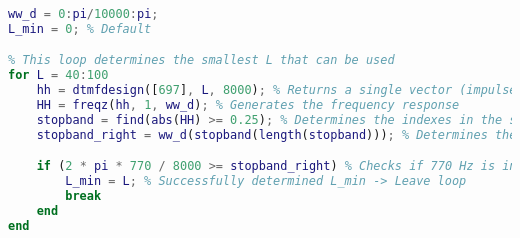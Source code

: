 \begin{lstlisting}[language=Matlab]
ww_d = 0:pi/10000:pi;
L_min = 0; % Default

% This loop determines the smallest L that can be used
for L = 40:100
    hh = dtmfdesign([697], L, 8000); % Returns a single vector (impulse response)
    HH = freqz(hh, 1, ww_d); % Generates the frequency response
    stopband = find(abs(HH) >= 0.25); % Determines the indexes in the stopband
    stopband_right = ww_d(stopband(length(stopband))); % Determines the right index

    if (2 * pi * 770 / 8000 >= stopband_right) % Checks if 770 Hz is in the stopband
        L_min = L; % Successfully determined L_min -> Leave loop
        break
    end
end
\end{lstlisting}
